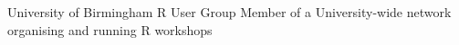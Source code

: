 {University of Birmingham}
{R User Group}
{Member of a University-wide network organising and running R workshops}